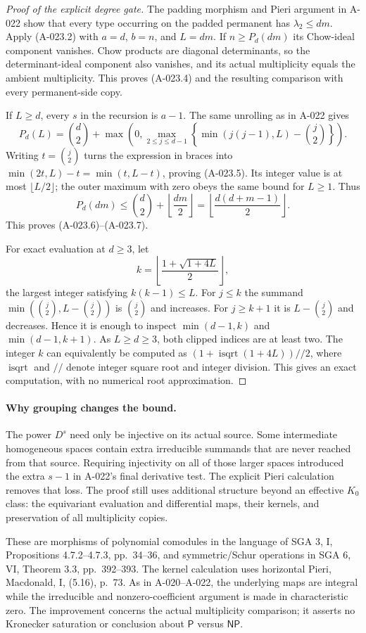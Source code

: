 \begin{proof}[Proof of the explicit degree gate]
The padding morphism and Pieri argument in A-022 show that
every type occurring on the padded permanent has
$\lambda_2\leq dm$. Apply (A-023.2) with $a=d$, $b=n$,
and $L=dm$. If $n\geq P_d(dm)$ its Chow-ideal component
vanishes. Chow products are diagonal determinants, so the
determinant-ideal component also vanishes, and its actual
multiplicity equals the ambient multiplicity. This proves
(A-023.4) and the resulting comparison with every
permanent-side copy.

If $L\geq d$, every $s$ in the recursion is $a-1$.
The same unrolling as in A-022 gives
\[
 P_d(L)=\binom d2+
 \max\left(0,\max_{2\leq j\leq d-1}
       \left\{\min(j(j-1),L)-\binom j2\right\}\right).
\]
Writing $t=\binom j2$ turns the expression in braces
into $\min(2t,L)-t=\min(t,L-t)$, proving (A-023.5).
Its integer value is at most $\lfloor L/2\rfloor$;
the outer maximum with zero obeys the same bound for $L\geq1$.
Thus
\[
 P_d(dm)\leq\binom d2+\left\lfloor\frac{dm}{2}\right\rfloor
              =\left\lfloor\frac{d(d+m-1)}2\right\rfloor.
\]
This proves (A-023.6)--(A-023.7).

For exact evaluation at $d\geq3$, let
\[
 k=\left\lfloor\frac{1+\sqrt{1+4L}}2\right\rfloor,
\]
the largest integer satisfying $k(k-1)\leq L$.
For $j\leq k$ the summand $\min(\binom j2,L-\binom j2)$
is $\binom j2$ and increases. For $j\geq k+1$ it is
$L-\binom j2$ and decreases. Hence it is enough to inspect
$\min(d-1,k)$ and $\min(d-1,k+1)$. As $L\geq d\geq3$,
both clipped indices are at least two. The integer $k$ can
equivalently be computed as
$(1+\operatorname{isqrt}(1+4L))\mathbin{//}2$, where
\(\operatorname{isqrt}\) and \(//\) denote integer square
root and integer division. This gives an exact computation,
with no numerical root approximation. \end{proof}

\paragraph{Why grouping changes the bound.}
The power $D^s$ need only be injective on its actual source.
Some intermediate homogeneous spaces contain extra irreducible
summands that are never reached from that source. Requiring
injectivity on all of those larger spaces introduced the
extra $s-1$ in A-022's final derivative test. The explicit
Pieri calculation removes that loss. The proof still uses
additional structure beyond an effective $K_0$ class: the
equivariant evaluation and differential maps, their kernels,
and preservation of all multiplicity copies.

These are morphisms of polynomial comodules in the language
of SGA 3, I, Propositions 4.7.2--4.7.3, pp.~34--36, and
symmetric/Schur operations in SGA 6, VI, Theorem 3.3,
pp.~392--393. The kernel calculation uses horizontal Pieri,
Macdonald, I, (5.16), p.~73. As in A-020--A-022, the
underlying maps are integral while the irreducible and
nonzero-coefficient argument is made in characteristic zero.
The improvement concerns the actual multiplicity comparison;
it asserts no Kronecker saturation or conclusion about
$\mathsf P$ versus $\mathsf{NP}$.
